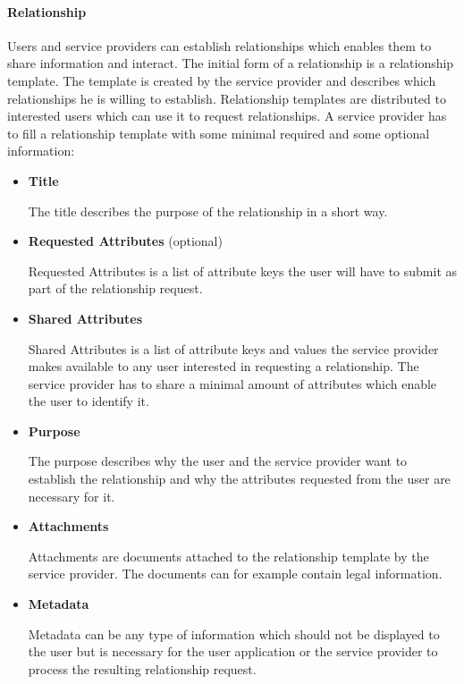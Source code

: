 \paragraph{Relationship} 

Users and service providers can establish relationships which enables them to share information and interact. The initial form of a relationship is a relationship template. The template is created by the service provider and describes which relationships he is willing to establish. Relationship templates are distributed to interested users which can use it to request relationships. A service provider has to fill a relationship template with some minimal required and some optional information:

\begin{itemize}
    \item \textbf{Title}
    
    The title describes the purpose of the relationship in a short way.
    
    \item \textbf{Requested Attributes} (optional)
    
    Requested Attributes is a list of attribute keys the user will have to submit as part of the relationship request.
    
    \item \textbf{Shared Attributes}
    
    Shared Attributes is a list of attribute keys and values the service provider makes available to any user interested in requesting a relationship. The service provider has to share a minimal amount of attributes which enable the user to identify it. 
    
    \item \textbf{Purpose}
    
    The purpose describes why the user and the service provider want to establish the relationship and why the attributes requested from the user are necessary for it.
    
    \item \textbf{Attachments}
    
    Attachments are documents attached to the relationship template by the service provider. The documents can for example contain legal information.
    
    \item \textbf{Metadata}
    
    Metadata can be any type of information which should not be displayed to the user but is necessary for the user application or the service provider to process the resulting relationship request.
    
\end{itemize}

